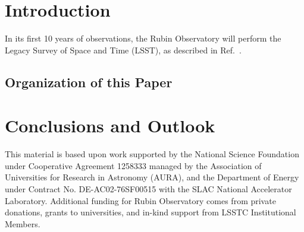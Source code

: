 \section{Introduction}

In its first 10 years of observations, the Rubin Observatory will perform the Legacy Survey of Space and Time (LSST), as described
in Ref.~. 

\subsection{Organization of this Paper}


\section{Conclusions and Outlook}
\label{sec:conclusions}

\acknowledgments
This material is based upon work supported by the National Science Foundation under Cooperative Agreement 1258333 managed by the Association of Universities for Research in Astronomy (AURA), and the Department of Energy under Contract No. DE-AC02-76SF00515 with the SLAC National Accelerator Laboratory. 
Additional funding for Rubin Observatory comes from private donations, grants to universities, and in-kind support from LSSTC Institutional Members.

